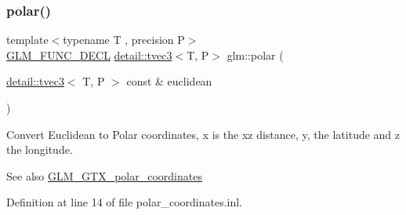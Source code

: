 \subsubsection{\texorpdfstring{polar()}{polar()}}
{\footnotesize\ttfamily template$<$typename T , precision P$>$ \\
\hyperlink{setup_8hpp_ab2d052de21a70539923e9bcbf6e83a51}{G\+L\+M\+\_\+\+F\+U\+N\+C\+\_\+\+D\+E\+CL} \hyperlink{structglm_1_1detail_1_1tvec3}{detail\+::tvec3}$<$T, P$>$ glm\+::polar (\begin{DoxyParamCaption}\item[{\hyperlink{structglm_1_1detail_1_1tvec3}{detail\+::tvec3}$<$ T, P $>$ const \&}]{euclidean }\end{DoxyParamCaption})}

Convert Euclidean to Polar coordinates, x is the xz distance, y, the latitude and z the longitude.

\begin{DoxySeeAlso}{See also}
\hyperlink{group__gtx__polar__coordinates}{G\+L\+M\+\_\+\+G\+T\+X\+\_\+polar\+\_\+coordinates} 
\end{DoxySeeAlso}


Definition at line 14 of file polar\+\_\+coordinates.\+inl.

